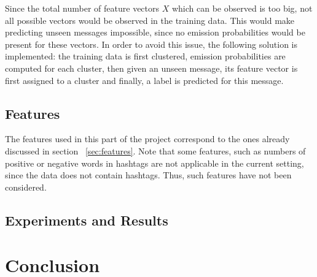 \documentclass{article} %
\begin{document}
\noindent Since the total number of feature vectors $X$ which can be observed is too big, not all possible vectors would be observed in the training data. This would make predicting unseen messages impossible, since no emission probabilities would be present for these vectors. In order to avoid this issue, the following solution is implemented: the training data is first clustered, emission probabilities are computed for each cluster, then given an unseen message, its feature vector is first assigned to a cluster and finally, a label is predicted for this message. 

\subsection{Features}

\noindent The features used in this part of the project correspond to the ones already discussed in section ~\ref{sec:features}. Note that some features, such as numbers of positive or negative words in hashtags are not applicable in the current setting, since the data does not contain hashtags. Thus, such features have not been considered. 


\subsection{Experiments and Results}

\begin{comment}
Experiments / Empirical evaluation (roughly 2-3 pages)
• Any details about experiments (dataset sizes, parameter selection, etc)
• Results
• Analysis (discussion of results / visualization / findings / etc)
\end{comment}



\section{Conclusion}

\begin{comment}
Discussion and Conclusions (0.5 – 1 page)
• Refer to the research questions you defined in your introduction.
• Any related work you are aware of?
• Challenges you observed?
• “Future work” (you do not need to do this work really J, but what would you change in the
model / what experiments you would run / etc, if you would have a chance to do this? What other
people should look into?
• Any thoughts / observation / wider implications
\end{comment}
\end{document}
